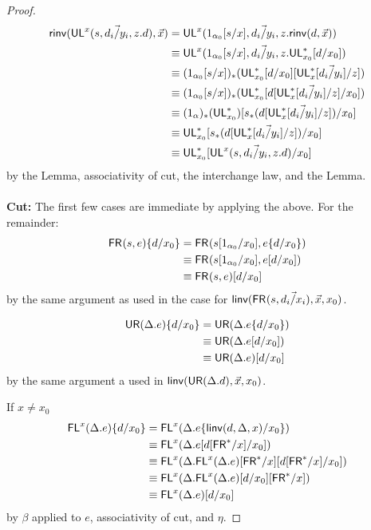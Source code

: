 \begin{proof}
\begin{align*}
\mathsf{rinv}(\mathsf{UL}^{x}_{}(s,\vec{d_i/y_i},z.d),\vec{x}) 
&= \mathsf{UL}^{x}_{}(1_{\alpha_0}[s/x],\vec{d_i/y_i},z.\mathsf{rinv}(d,\vec{x}))\\
&\equiv \mathsf{UL}^{x}_{}(1_{\alpha_0}[s/x],\vec{d_i/y_i},z.\mathsf{UL}^*_{x_0}[d/x_0])\\
&\equiv (1_{\alpha_0}[s/x])_*(\mathsf{UL}^*_{x_0}[d/x_0][\mathsf{UL}^*_{x}[\vec{d_i/y_i}]/z]) \\
&\equiv (1_{\alpha_0}[s/x])_*(\mathsf{UL}^*_{x_0}[d[\mathsf{UL}^*_{x}[\vec{d_i/y_i}]/z]/x_0]) \\
&\equiv (1_\alpha)_*(\mathsf{UL}^*_{x_0})[s_*(d[\mathsf{UL}^*_{x}[\vec{d_i/y_i}]/z])/x_0] \\
&\equiv \mathsf{UL}^*_{x_0}[s_*(d[\mathsf{UL}^*_{x}[\vec{d_i/y_i}]/z])/x_0] \\
&\equiv \mathsf{UL}^*_{x_0}[\mathsf{UL}^{x}_{}(s,\vec{d_i/y_i},z.d)/x_0]
\end{align*}
by the Lemma, associativity of cut, the interchange law, and the Lemma.
\\~\\
\textbf{Cut:} The first few cases are immediate by applying the above. For the remainder:
\begin{align*}
\mathsf{FR}_{}(s,e)\{d/x_0\}
&= {\mathsf{FR}_{}(s[1_{\alpha_0}/x_0],e\{d/x_0\})}\\
&\equiv {\ensuremath{\mathsf{FR}_{}(s[1_{\alpha_0}/x_0],e[d/x_0])}}\\
&\equiv \mathsf{FR}_{}(s,e)[d/x_0]
\end{align*}
by the same argument as used in the case for $\mathsf{linv}(\mathsf{FR}_{}(s,\vec{d_i/x_i}),\vec{x},x_0)$.

\begin{align*}
\mathsf{UR}(\Delta.e)\{d/x_0\} 
&= \mathsf{UR}(\Delta.e\{d/x_0\})\\
&\equiv \mathsf{UR}(\Delta.e[d/x_0])\\
&\equiv \mathsf{UR}(\Delta.e)[d/x_0] 
\end{align*}
by the same argument a used in $\mathsf{linv}(\mathsf{UR}(\Delta.d),\vec{x},x_0)$.

If $x \neq x_0$
\begin{align*}
\mathsf{FL}^{x}(\Delta.e)\{d/x_0\} 
&= \mathsf{FL}^{x}(\Delta.e\{\mathsf{linv}(d,\Delta,x)/x_0\}) \\
&\equiv \mathsf{FL}^{x}(\Delta.e[d[\mathsf{FR}^*/x]/x_0]) \\
&\equiv \mathsf{FL}^{x}(\Delta.\mathsf{FL}^{x}(\Delta.e)[\mathsf{FR}^*/x][d[\mathsf{FR}^*/x]/x_0]) \\
&\equiv \mathsf{FL}^{x}(\Delta.\mathsf{FL}^{x}(\Delta.e)[d/x_0][\mathsf{FR}^*/x]) \\
&\equiv \mathsf{FL}^{x}(\Delta.e)[d/x_0] 
\end{align*}
by $\beta$ applied to $e$, associativity of cut, and $\eta$.


\end{proof}
